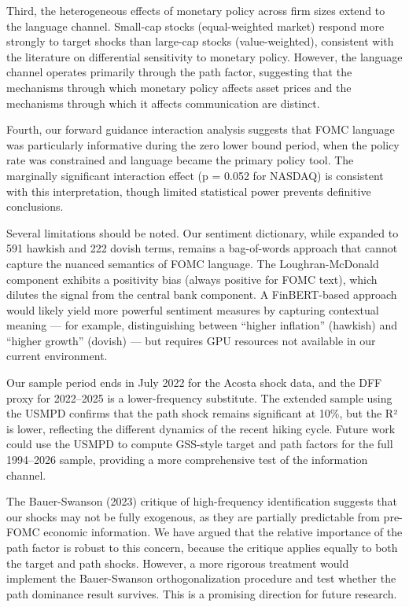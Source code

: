 \documentclass[
]{article}
\begin{document}
Third, the heterogeneous effects of monetary policy across firm sizes
extend to the language channel. Small-cap stocks (equal-weighted market)
respond more strongly to target shocks than large-cap stocks
(value-weighted), consistent with the literature on differential
sensitivity to monetary policy. However, the language channel operates
primarily through the path factor, suggesting that the mechanisms
through which monetary policy affects asset prices and the mechanisms
through which it affects communication are distinct.

Fourth, our forward guidance interaction analysis suggests that FOMC
language was particularly informative during the zero lower bound
period, when the policy rate was constrained and language became the
primary policy tool. The marginally significant interaction effect (p =
0.052 for NASDAQ) is consistent with this interpretation, though limited
statistical power prevents definitive conclusions.

Several limitations should be noted. Our sentiment dictionary, while
expanded to 591 hawkish and 222 dovish terms, remains a bag-of-words
approach that cannot capture the nuanced semantics of FOMC language. The
Loughran-McDonald component exhibits a positivity bias (always positive
for FOMC text), which dilutes the signal from the central bank
component. A FinBERT-based approach would likely yield more powerful
sentiment measures by capturing contextual meaning --- for example,
distinguishing between ``higher inflation'' (hawkish) and ``higher
growth'' (dovish) --- but requires GPU resources not available in our
current environment.

Our sample period ends in July 2022 for the Acosta shock data, and the
DFF proxy for 2022--2025 is a lower-frequency substitute. The extended
sample using the USMPD confirms that the path shock remains significant
at 10\%, but the R² is lower, reflecting the different dynamics of the
recent hiking cycle. Future work could use the USMPD to compute
GSS-style target and path factors for the full 1994--2026 sample,
providing a more comprehensive test of the information channel.

The Bauer-Swanson (2023) critique of high-frequency identification
suggests that our shocks may not be fully exogenous, as they are
partially predictable from pre-FOMC economic information. We have argued
that the relative importance of the path factor is robust to this
concern, because the critique applies equally to both the target and
path shocks. However, a more rigorous treatment would implement the
Bauer-Swanson orthogonalization procedure and test whether the path
dominance result survives. This is a promising direction for future
research.
\end{document}
